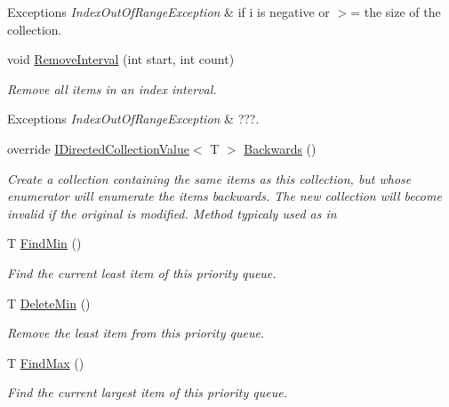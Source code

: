 \begin{DoxyCompactItemize}
\begin{DoxyCompactList}
\begin{DoxyExceptions}{Exceptions}
{\em Index\+Out\+Of\+Range\+Exception} & if i is negative or $>$= the size of the collection. \\
\hline
\end{DoxyExceptions}
\end{DoxyCompactList}\item 
void \hyperlink{class_c5_1_1_tree_bag_af77f6e665a61d88fa0ed881a66984601}{Remove\+Interval} (int start, int count)
\begin{DoxyCompactList}\small\item\em Remove all items in an index interval. 
\begin{DoxyExceptions}{Exceptions}
{\em Index\+Out\+Of\+Range\+Exception} & ???. \\
\hline
\end{DoxyExceptions}
\end{DoxyCompactList}\item 
override \hyperlink{interface_c5_1_1_i_directed_collection_value}{I\+Directed\+Collection\+Value}$<$ T $>$ \hyperlink{class_c5_1_1_tree_bag_aa8d9bd7240bf759fc52c3a14b1f2e43a}{Backwards} ()
\begin{DoxyCompactList}\small\item\em Create a collection containing the same items as this collection, but whose enumerator will enumerate the items backwards. The new collection will become invalid if the original is modified. Method typicaly used as in \end{DoxyCompactList}\item 
T \hyperlink{class_c5_1_1_tree_bag_a1849cab66d006e4686cb2d43972e7ebe}{Find\+Min} ()
\begin{DoxyCompactList}\small\item\em Find the current least item of this priority queue. \end{DoxyCompactList}\item 
T \hyperlink{class_c5_1_1_tree_bag_a3179d4112ccd6c99b0a8089315181418}{Delete\+Min} ()
\begin{DoxyCompactList}\small\item\em Remove the least item from this priority queue. \end{DoxyCompactList}\item 
T \hyperlink{class_c5_1_1_tree_bag_a287455da0a4818bfc2a1e56584f09c8c}{Find\+Max} ()
\begin{DoxyCompactList}\small\item\em Find the current largest item of this priority queue. \end{DoxyCompactList}\item 

\end{DoxyCompactItemize}
